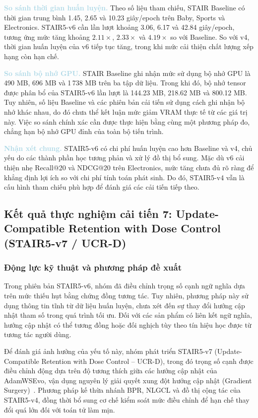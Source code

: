 \noindent\textcolor{lightblue}{\textbf{So sánh thời gian huấn luyện.}} Theo số liệu tham chiếu, STAIR Baseline có thời gian trung bình 1.45, 2.65 và 10.23 giây/epoch trên Baby, Sports và Electronics. STAIR5-v6 cần lần lượt khoảng 3.06, 6.17 và 42.84 giây/epoch, tương ứng mức tăng khoảng $2.11\times$, $2.33\times$ và $4.19\times$ so với Baseline. So với v4, thời gian huấn luyện của v6 tiếp tục tăng, trong khi mức cải thiện chất lượng xếp hạng còn hạn chế.

\noindent\textcolor{lightblue}{\textbf{So sánh bộ nhớ GPU.}} STAIR Baseline ghi nhận mức sử dụng bộ nhớ GPU là 490 MB, 696 MB và 1\,738 MB trên ba tập dữ liệu. Trong khi đó, bộ nhớ tensor được phân bổ của STAIR5-v6 lần lượt là 144.23 MB, 218.62 MB và 800.12 MB. Tuy nhiên, số liệu Baseline và các phiên bản cải tiến sử dụng cách ghi nhận bộ nhớ khác nhau, do đó chưa thể kết luận mức giảm VRAM thực tế từ các giá trị này. Việc so sánh chính xác cần được thực hiện bằng cùng một phương pháp đo, chẳng hạn bộ nhớ GPU đỉnh của toàn bộ tiến trình.

\noindent\textcolor{lightblue}{\textbf{Nhận xét chung.}} STAIR5-v6 có chi phí huấn luyện cao hơn Baseline và v4, chủ yếu do các thành phần học tương phản và xử lý đồ thị bổ sung. Mặc dù v6 cải thiện nhẹ Recall@20 và NDCG@20 trên Electronics, mức tăng chưa đủ rõ ràng để khẳng định lợi ích so với chi phí tính toán phát sinh. Do đó, STAIR5-v4 vẫn là cấu hình tham chiếu phù hợp để đánh giá các cải tiến tiếp theo.

\subsection{Kết quả thực nghiệm cải tiến 7: Update-Compatible Retention with Dose Control (STAIR5-v7 / UCR-D)}

\subsubsection{Động lực kỹ thuật và phương pháp đề xuất}

Trong phiên bản STAIR5-v6, nhóm đã điều chỉnh trọng số cạnh ngữ nghĩa dựa trên mức thiếu hụt bằng chứng đồng tương tác. Tuy nhiên, phương pháp này sử dụng thông tin tĩnh từ dữ liệu huấn luyện, chưa xét đến sự thay đổi hướng cập nhật tham số trong quá trình tối ưu. Đối với các sản phẩm có liên kết ngữ nghĩa, hướng cập nhật có thể tương đồng hoặc đối nghịch tùy theo tín hiệu học được từ tương tác người dùng.

Để đánh giá ảnh hưởng của yếu tố này, nhóm phát triển STAIR5-v7 (Update-Compatible Retention with Dose Control -- UCR-D), trong đó trọng số cạnh được điều chỉnh động dựa trên độ tương thích giữa các hướng cập nhật của AdamWSEvo, vận dụng nguyên lý giải quyết xung đột hướng cập nhật (Gradient Surgery)~\cite{yu2020gradient}. Phương pháp kế thừa nhánh BPR, NLGCL và đồ thị cộng tác của STAIR5-v4, đồng thời bổ sung cơ chế kiểm soát mức điều chỉnh để hạn chế thay đổi quá lớn đối với toán tử làm mịn.



